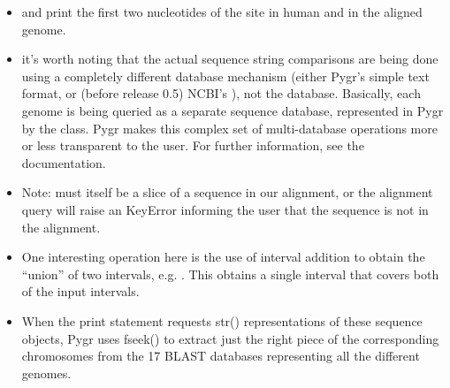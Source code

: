 \documentclass{howto}
\begin{document}
\begin{itemize}
\item
{} and  print the first two nucleotides
of the site in human and in the aligned genome.

\item
it's worth noting that the actual sequence string comparisons are being
done using a completely different database mechanism (either Pygr's
simple  text format, or (before release 0.5) NCBI's ),
not the  database.  Basically, each genome is being queried
as a separate sequence database, represented in Pygr by the
 class.  Pygr makes this complex set of multi-database
operations more or less transparent to the user.
For further information, see the  documentation.  

\item
Note:  must itself be a slice of a sequence in our alignment, 
or the alignment query  will raise an KeyError informing
the user that the sequence  is not in the alignment.

\item
One interesting operation here is the use of interval
addition to obtain the ``union'' of two intervals, e.g. .
This obtains a single interval that covers both of the input intervals.

\item
When the print  statement requests str() representations of these sequence objects, Pygr uses fseek() to extract just the right piece of the corresponding chromosomes from the 17 BLAST databases representing all the different genomes.


\end{itemize}
\end{document}
